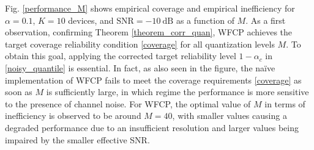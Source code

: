 \documentclass[12pt, draftclsnofoot, onecolumn]{IEEEtran}
\begin{document}
Fig. \ref{performance_M} shows empirical coverage and empirical inefficiency for $\alpha=0.1$, $K=10$ devices, and $\text{SNR}=-10~\text{dB}$ as a function of $M$. As a first observation, confirming Theorem \ref{theorem_corr_quan}, WFCP achieves the target coverage reliability condition \eqref{coverage} for all quantization levels $M$. To obtain this goal, applying the corrected target reliability level $1-\alpha_c$ in \eqref{noisy_quantile} is essential. In fact, as also seen in the figure, the na\"ive implementation of WFCP fails to meet the coverage requirements \eqref{coverage} as soon as $M$ is sufficiently large, in which regime the performance is more sensitive to the presence of channel noise. For WFCP, the optimal value of $M$ in terms of inefficiency is observed to be around $M=40$, with smaller values causing a degraded performance due to an insufficient resolution and larger values being impaired by the smaller effective SNR.
\end{document}
